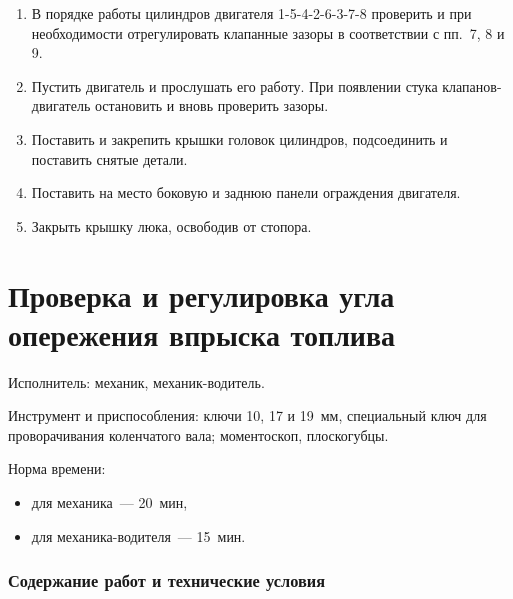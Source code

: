 \begin{enumerate}
    \textit{Примечания:} 
    \begin{itemize}
        \item \textit{Щуп толщиной 0,25~мм должен входить в зазор с легким нажимом, толщиной 0,3~мм~--- с усилием.}
        \item \textit{Регулировать на холодном двигателе по истечении 30~мин после его остановки.}
    \end{itemize}
    \item В порядке работы цилиндров двигателя 1-5-4-2-6-3-7-8 проверить и при необходимости отрегулировать клапанные зазоры в соответствии с пп.~7, 8 и 9. 
    \item Пустить двигатель и прослушать его работу. При появлении стука клапанов-двигатель остановить и вновь проверить зазоры. 
    \item Поставить и закрепить крышки головок цилиндров, подсоединить и поставить снятые детали. 
    \item Поставить на место боковую и заднюю панели ограждения двигателя. 
    \item Закрыть крышку люка, освободив от стопора. 
\end{enumerate}

\section{Проверка и регулировка угла опережения впрыска топлива}
Исполнитель: механик, механик-водитель. 

Инструмент и приспособления: ключи 10, 17 и 19~мм, специальный ключ для проворачивания коленчатого вала; моментоскоп, плоскогубцы. 

Норма времени:
\begin{itemize}
    \item для механика~--- 20~мин, 
    \item для механика-водителя~--- 15~мин. 
\end{itemize} 

\subsubsection{Содержание работ и технические условия}

